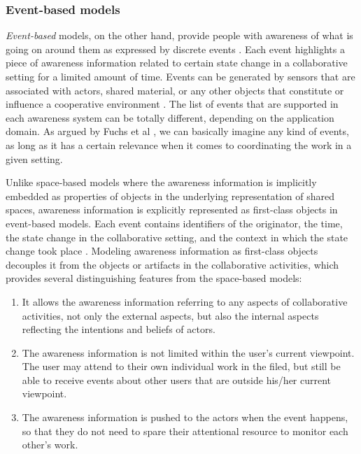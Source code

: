\subsubsection{Event-based models} %
\label{ssub:event_based_model}
\emph{Event-based} models, on the other hand, provide people with awareness of what is going on around them as expressed by discrete events \cite{rittenbruch2009a}. Each event highlights a piece of awareness information related to certain state change in a collaborative setting for a limited amount of time. Events can be generated by sensors that are associated with actors, shared material, or any other objects that constitute or influence a cooperative environment \cite{prinz1999a}. The list of events that are supported in each awareness system can be totally different, depending on the application domain. As argued by Fuchs et al \cite{Fuchs1995}, we can basically imagine any kind of events, as long as it has a certain relevance when it comes to coordinating the work in a given setting. 

Unlike space-based models where the awareness information is implicitly embedded as properties of objects in the underlying representation of shared spaces, awareness information is explicitly represented as first-class objects in event-based models. Each event contains identifiers of the originator, the time, the state change in the collaborative setting, and the context in which the state change took place \cite{fuchs1999a}. Modeling awareness information as first-class objects decouples it from the objects or artifacts in the collaborative activities, which provides several distinguishing features from the space-based models:

\begin{enumerate}
   \item It allows the awareness information referring to any aspects of collaborative activities, not only the external aspects, but also the internal aspects reflecting the intentions and beliefs of actors.
   \item The awareness information is not limited within the user's current viewpoint. The user may attend to their own individual work in the filed, but still be able to receive events about other users that are outside his/her current viewpoint. 
   \item The awareness information is pushed to the actors when the event happens, so that they do not need to spare their attentional resource to monitor each other's work.
\end{enumerate}

